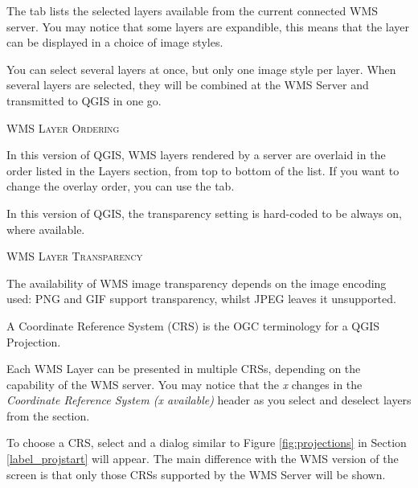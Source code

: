  \label{ogc-wms-layers}

The  tab lists the selected layers available from the current 
connected WMS server.  You may notice that some layers are expandible, this 
means that the layer can be displayed in a choice of image styles.

You can select several layers at once, but only one image style per layer.
When several layers are selected, they will be combined at the WMS Server
and transmitted to QGIS in one go.

\begin{Tip}[ht]\caption{\textsc{WMS Layer Ordering}}
In this version of QGIS, WMS layers rendered by a server are overlaid
in the order listed in the Layers section, from top to bottom of the list.
If you want to change the overlay order, you can use the  tab.
\end{Tip}

\label{ogc-wms-transparency}

In this version of QGIS, the transparency setting is hard-coded to
be always on, where available.

\begin{Tip}[ht]\caption{\textsc{WMS Layer Transparency}}
The availability of WMS image transparency depends on
the image encoding used:  PNG and GIF support transparency,
whilst JPEG leaves it unsupported.
\end{Tip}


A Coordinate Reference System (CRS) is the OGC terminology for a QGIS Projection.

Each WMS Layer can be presented in multiple CRSs, depending
on the capability of the WMS server.  You may notice that the \textsl{x} 
changes in the \textsl{Coordinate Reference System (x available)} header as you
select and deselect layers from the  section.

To choose a CRS, select  and a dialog similar to
Figure \ref{fig:projections} in Section \ref{label_projstart} will appear.
The main difference with the WMS version of the screen is that only
those CRSs supported by the WMS Server will be shown.

